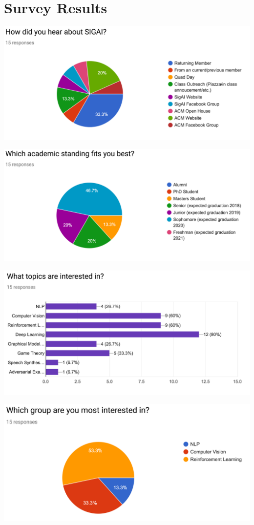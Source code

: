 \documentclass{beamer}
\begin{document}
\section{Survey Results}
\begin{frame}
  \begin{center}
    \includegraphics[width=0.8\linewidth]{feedback1.png}
  \end{center}
\end{frame}
\begin{frame}
  \begin{center}
    \includegraphics[width=0.8\linewidth]{feedback2.png}
  \end{center}
\end{frame}
\begin{frame}
  \begin{center}
    \includegraphics[width=0.8\linewidth]{feedback3.png}
  \end{center}
\end{frame}
\begin{frame}
  \begin{center}
    \includegraphics[width=0.8\linewidth]{feedback4.png}
  \end{center}
\end{frame}
\end{document}
